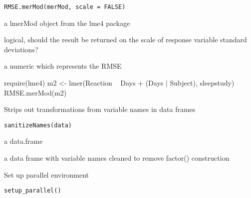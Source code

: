 \documentclass[letterpaper]{book}
\begin{document}
%
\begin{Usage}
\begin{verbatim}
RMSE.merMod(merMod, scale = FALSE)
\end{verbatim}
\end{Usage}
%
\begin{Arguments}
\begin{ldescription}
\item[\code{merMod}] a lmerMod object from the lme4 package

\item[\code{scale}] logical, should the result be returned on the scale of
response variable standard deviations?
\end{ldescription}
\end{Arguments}
%
\begin{Value}
a numeric which represents the RMSE
\end{Value}
%
\begin{Examples}
\begin{ExampleCode}
require(lme4)
m2 <- lmer(Reaction ~ Days + (Days | Subject), sleepstudy)
RMSE.merMod(m2)
\end{ExampleCode}
\end{Examples}
%
\begin{Description}\relax
Strips out transformations from variable names in data frames
\end{Description}
%
\begin{Usage}
\begin{verbatim}
sanitizeNames(data)
\end{verbatim}
\end{Usage}
%
\begin{Arguments}
\begin{ldescription}
\item[\code{data}] a data.frame
\end{ldescription}
\end{Arguments}
%
\begin{Value}
a data frame with variable names cleaned to remove factor() construction
\end{Value}
%
\begin{Description}\relax
Set up parallel environment
\end{Description}
%
\begin{Usage}
\begin{verbatim}
setup_parallel()
\end{verbatim}
\end{Usage}
\end{document}
